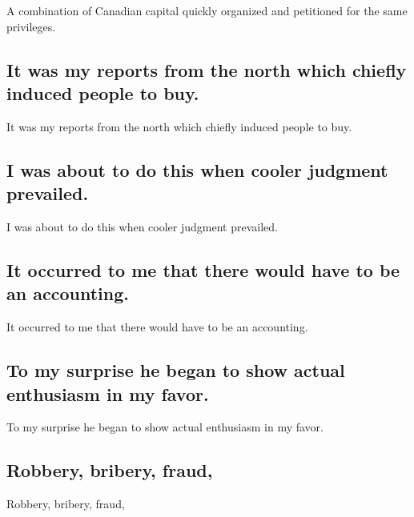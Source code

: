 \documentclass[]{article}
\begin{document}
A combination of Canadian capital quickly organized and petitioned for
the same privileges.

\hypertarget{it-was-my-reports-from-the-north-which-chiefly-induced-people-to-buy.}{%
\subsection{It was my reports from the north which chiefly induced
people to
buy.}\label{it-was-my-reports-from-the-north-which-chiefly-induced-people-to-buy.}}

It was my reports from the north which chiefly induced people to buy.

\hypertarget{i-was-about-to-do-this-when-cooler-judgment-prevailed.}{%
\subsection{I was about to do this when cooler judgment
prevailed.}\label{i-was-about-to-do-this-when-cooler-judgment-prevailed.}}

I was about to do this when cooler judgment prevailed.

\hypertarget{it-occurred-to-me-that-there-would-have-to-be-an-accounting.}{%
\subsection{It occurred to me that there would have to be an
accounting.}\label{it-occurred-to-me-that-there-would-have-to-be-an-accounting.}}

It occurred to me that there would have to be an accounting.

\hypertarget{to-my-surprise-he-began-to-show-actual-enthusiasm-in-my-favor.}{%
\subsection{To my surprise he began to show actual enthusiasm in my
favor.}\label{to-my-surprise-he-began-to-show-actual-enthusiasm-in-my-favor.}}

To my surprise he began to show actual enthusiasm in my favor.

\hypertarget{robbery-bribery-fraud}{%
\subsection{Robbery, bribery, fraud,}\label{robbery-bribery-fraud}}

Robbery, bribery, fraud,
\end{document}
